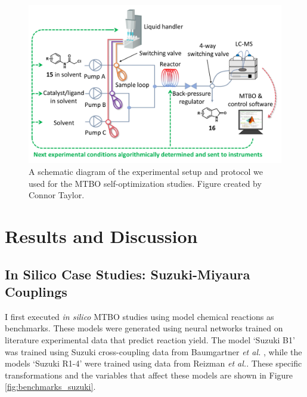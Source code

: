 \begin{figure}
    \centering
    \includegraphics{gfx/Chapter04/self_optimization_setup.png}
    \caption{A schematic diagram of the experimental setup and protocol we used for the MTBO self-optimization studies. Figure created by Connor Taylor.}
    \label{fig:self_opt_setup}
\end{figure}

\section{Results and Discussion}


\subsection{In Silico Case Studies: Suzuki-Miyaura Couplings}

I first executed \textit{in silico} MTBO studies using model chemical reactions as benchmarks. These models were generated using neural networks trained on literature experimental data that predict reaction yield. The model `Suzuki B1' was trained using Suzuki cross-coupling data from Baumgartner \textit{et al.} \cite{Baumgartner2018}, while the models `Suzuki R1-4' were trained using data from Reizman \textit{et al.}\cite{Reizman2016a}.  These specific transformations and the variables that affect these models are shown in Figure \ref{fig:benchmarks_suzuki}.

